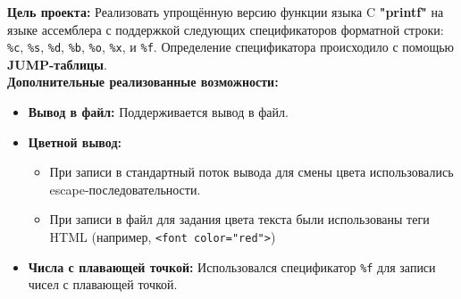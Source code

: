 \documentclass[A4,11pt]{article}
\begin{document}
      \small{
      \textbf{Цель проекта:} Реализовать упрощённую версию функции языка C \textbf{"printf"} на языке ассемблера
      с поддержкой следующих спецификаторов форматной строки:
\lstinline|%c|, \lstinline|%s|, \lstinline|%d|, \lstinline|%b|, \lstinline|%o|, \lstinline|%x|, и \lstinline|%f|.
Определение спецификатора происходило с помощью \textbf{JUMP-таблицы}.\\
\textbf{Дополнительные реализованные возможности:}
\begin{itemize}[nosep]
    \item \textbf{Вывод в файл:} Поддерживается вывод в файл.
    \item \textbf{Цветной вывод:}
    \begin{itemize}[nosep]
        \item При записи в стандартный поток вывода для смены цвета использовались escape-последовательности.
        \item При записи в файл для задания цвета текста были использованы теги HTML (например, \lstinline|<font color="red">|)
    \end{itemize}
    \item \textbf{Числа с плавающей точкой:} Использовался спецификатор \lstinline|%f| для записи чисел с плавающей точкой.
\end{itemize}

      }
\end{document}
